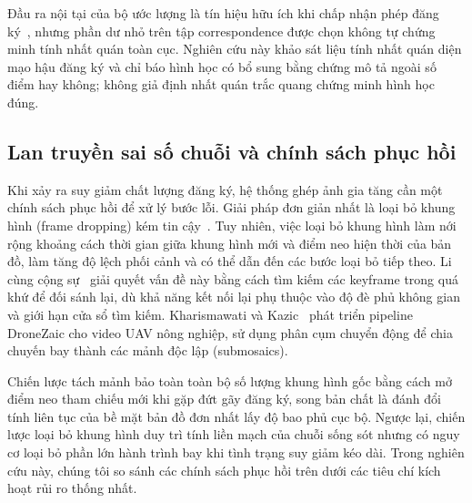 Đầu ra nội tại của bộ ước lượng là tín hiệu hữu ích khi chấp nhận phép đăng ký~\cite{hwang2026,li2023}, nhưng phần dư nhỏ trên tập correspondence được chọn không tự chứng minh tính nhất quán toàn cục. Nghiên cứu này khảo sát liệu tính nhất quán diện mạo hậu đăng ký và chỉ báo hình học có bổ sung bằng chứng mô tả ngoài số điểm hay không; không giả định nhất quán trắc quang chứng minh hình học đúng.

\subsection{Lan truyền sai số chuỗi và chính sách phục hồi}
Khi xảy ra suy giảm chất lượng đăng ký, hệ thống ghép ảnh gia tăng cần một chính sách phục hồi để xử lý bước lỗi. Giải pháp đơn giản nhất là loại bỏ khung hình (frame dropping) kém tin cậy~\cite{hwang2026}. Tuy nhiên, việc loại bỏ khung hình làm nới rộng khoảng cách thời gian giữa khung hình mới và điểm neo hiện thời của bản đồ, làm tăng độ lệch phối cảnh và có thể dẫn đến các bước loại bỏ tiếp theo. Li cùng cộng sự~\cite{li2023} giải quyết vấn đề này bằng cách tìm kiếm các keyframe trong quá khứ để đối sánh lại, dù khả năng kết nối lại phụ thuộc vào độ đè phủ không gian và giới hạn cửa sổ tìm kiếm. Kharismawati và Kazic~\cite{kharismawati2025} phát triển pipeline DroneZaic cho video UAV nông nghiệp, sử dụng phân cụm chuyển động để chia chuyến bay thành các mảnh độc lập (submosaics).

Chiến lược tách mảnh bảo toàn toàn bộ số lượng khung hình gốc bằng cách mở điểm neo tham chiếu mới khi gặp đứt gãy đăng ký, song bản chất là đánh đổi tính liên tục của bề mặt bản đồ đơn nhất lấy độ bao phủ cục bộ. Ngược lại, chiến lược loại bỏ khung hình duy trì tính liền mạch của chuỗi sống sót nhưng có nguy cơ loại bỏ phần lớn hành trình bay khi tình trạng suy giảm kéo dài. Trong nghiên cứu này, chúng tôi so sánh các chính sách phục hồi trên dưới các tiêu chí kích hoạt rủi ro thống nhất.
